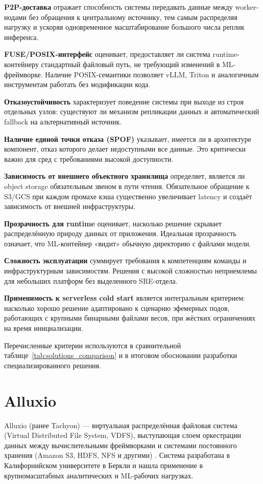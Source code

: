 \textbf{P2P-доставка} отражает способность системы передавать данные между worker-нодами без обращения к центральному источнику, тем самым распределяя нагрузку и ускоряя одновременное масштабирование большого числа реплик инференса.

\textbf{FUSE/POSIX-интерфейс} оценивает, предоставляет ли система runtime-контейнеру стандартный файловый путь, не требующий изменений в ML-фреймворке. Наличие POSIX-семантики позволяет vLLM, Triton и аналогичным инструментам работать без модификации кода.

\textbf{Отказоустойчивость} характеризует поведение системы при выходе из строя отдельных узлов: существуют ли механизм репликации данных и автоматический fallback на альтернативный источник.

\textbf{Наличие единой точки отказа (SPOF)} указывает, имеется ли в архитектуре компонент, отказ которого делает недоступными все данные. Это критически важно для сред с требованиями высокой доступности.

\textbf{Зависимость от внешнего объектного хранилища} определяет, является ли object storage обязательным звеном в пути чтения. Обязательное обращение к S3/GCS при каждом промахе кэша существенно увеличивает latency и создаёт зависимость от внешней инфраструктуры.

\textbf{Прозрачность для runtime} оценивает, насколько решение скрывает распределённую природу данных от приложения. Идеальная прозрачность означает, что ML-контейнер «видит» обычную директорию с файлами модели.

\textbf{Сложность эксплуатации} суммирует требования к компетенциям команды и инфраструктурным зависимостям. Решения с высокой сложностью неприемлемы для небольших платформ без выделенного SRE-отдела.

\textbf{Применимость к serverless cold start} является интегральным критерием: насколько хорошо решение адаптировано к сценарию эфемерных подов, работающих с крупными бинарными файлами весов, при жёстких ограничениях на время инициализации.

Перечисленные критерии используются в сравнительной таблице~\ref{tab:solutions_comparison} и в итоговом обосновании разработки специализированного решения.

\section{Alluxio}
\label{sec:alluxio}

Alluxio (ранее Tachyon) --- виртуальная распределённая файловая система (Virtual Distributed File System, VDFS), выступающая слоем оркестрации данных между вычислительными фреймворками и системами постоянного хранения (Amazon S3, HDFS, NFS и другими) \cite{alluxio_arch}. Система разработана в Калифорнийском университете в Беркли и нашла применение в крупномасштабных аналитических и ML-рабочих нагрузках.

